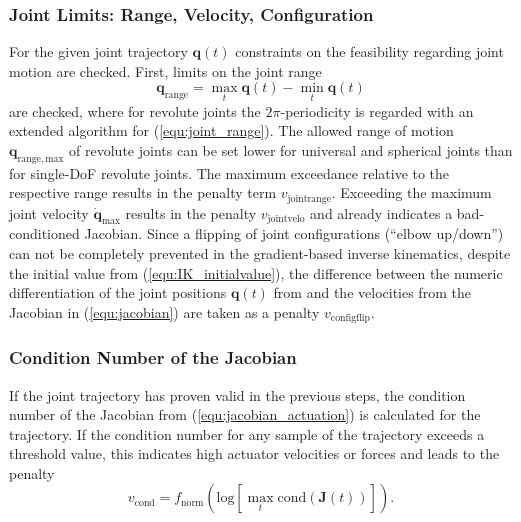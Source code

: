 \documentclass[fleqn,a4paper,10pt]{article}
\newcommand{\bm}[1]{\mathbf{#1}}
\begin{document}
\begin{multicols}{2}
\subsubsection{Joint Limits: Range, Velocity, Configuration}

For the given joint trajectory $\bm{q}(t)$ constraints on the feasibility regarding joint motion are checked.
First, limits on the joint range %
%
\begin{equation}
\bm{q}_\mathrm{range} = \max\limits_{t} \bm{q}(t) - \min\limits_{t} \bm{q}(t)
\label{equ:joint_range}
\end{equation}
%
are checked, where for revolute joints the $2\pi$-periodicity is regarded with an extended algorithm for (\ref{equ:joint_range}).
The allowed range of motion $\bm{q}_\mathrm{range,max}$ of revolute joints can be set lower for universal and spherical joints than for single-DoF revolute joints.
The maximum exceedance relative to the respective range results in the penalty term $v_\mathrm{jointrange}$.
%
Exceeding the maximum joint velocity $\dot{\bm{q}}_\mathrm{max}$ results in the penalty $v_\mathrm{jointvelo}$ and already indicates a bad-conditioned Jacobian.
%
Since a flipping of joint configurations (``elbow up/down'') can not be completely prevented in the gradient-based inverse kinematics, despite the initial value from (\ref{equ:IK_initialvalue}), the difference between the numeric differentiation of the joint positions $\bm{q}(t)$ from  and the velocities from the Jacobian in (\ref{equ:jacobian}) are taken as a penalty $v_\mathrm{configflip}$.


\subsubsection{Condition Number of the Jacobian}

If the joint trajectory has proven valid in the previous steps, the condition number of the Jacobian from (\ref{equ:jacobian_actuation}) is calculated for the trajectory.
If the condition number for any sample of the trajectory exceeds a threshold value, this indicates high actuator velocities or forces and leads to the penalty
%
\begin{equation}
v_{\mathrm{cond}} = f_\mathrm{norm}(\mathrm{log}[\max\limits_{t}  \mathrm{cond}(\bm{J}(t))]). %
\end{equation}
%



\end{multicols}
\end{document}

